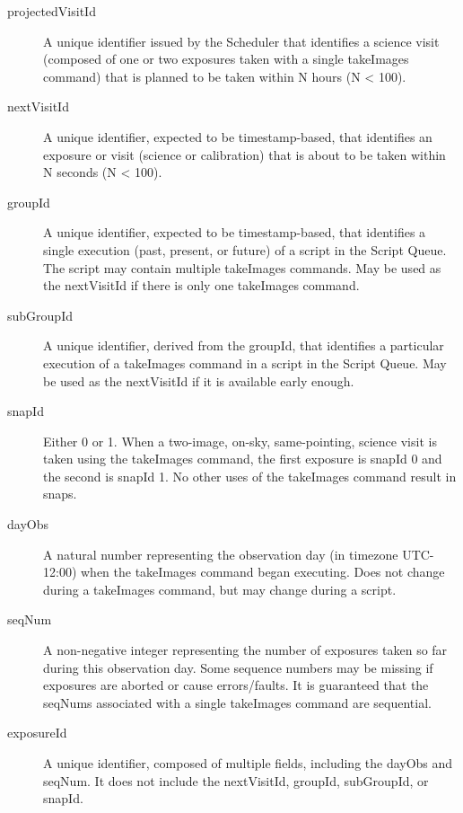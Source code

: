 \documentclass[SE,authoryear,toc]{lsstdoc}
\begin{document}
\begin{description}
  \item[projectedVisitId]
    A unique identifier issued by the Scheduler that identifies a science visit
    (composed of one or two exposures taken with a single takeImages command)
    that is planned to be taken within N hours (N < 100).

  \item[nextVisitId]
    A unique identifier, expected to be timestamp-based, that identifies an
    exposure or visit (science or calibration) that is about to be taken within
    N seconds (N < 100).

  \item[groupId]
    A unique identifier, expected to be timestamp-based, that identifies a
    single execution (past, present, or future) of a script in the Script
    Queue.  The script may contain multiple takeImages commands.  May be used
    as the nextVisitId if there is only one takeImages command.

  \item[subGroupId]
    A unique identifier, derived from the groupId, that identifies a
    particular execution of a takeImages command in a script in the Script
    Queue.  May be used as the nextVisitId if it is available early enough.

  \item[snapId]
    Either 0 or 1.  When a two-image, on-sky, same-pointing, science visit
    is taken using the takeImages command, the first exposure is snapId 0 and
    the second is snapId 1.  No other uses of the takeImages command result in
    snaps.

  \item[dayObs]
    A natural number representing the observation day (in timezone UTC-12:00)
    when the takeImages command began executing.  Does not change during a
    takeImages command, but may change during a script.

  \item[seqNum]
    A non-negative integer representing the number of exposures taken so far
    during this observation day.  Some sequence numbers may be missing if
    exposures are aborted or cause errors/faults.  It is guaranteed that
    the seqNums associated with a single takeImages command are sequential.

  \item[exposureId]
    A unique identifier, composed of multiple fields, including the dayObs and
    seqNum.  It does not include the nextVisitId, groupId, subGroupId, or
    snapId.


\end{description}
\end{document}

